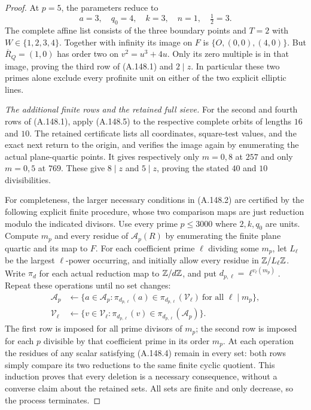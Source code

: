 \begin{proof}
At \(p=5\), the parameters reduce to
\[
                    a=3,\quad q_0=4,\quad k=3,
                           \quad n=1,\quad\tfrac12=3.
\tag{A.148.9}
\]
The complete affine list consists of the three boundary
points and \(T=2\) with \(W\in\{1,2,3,4\}\).
Together with infinity its image on \(F\) is
\(\{O,(0,0),(4,0)\}\).
But \(\overline R_Q=(1,0)\) has order two on
\(v^2=u^3+4u\).
Only its zero multiple is in that image, proving the third
row of (A.148.1) and \(2\mid z\).
In particular these two primes alone exclude every profinite
unit on either of the two explicit elliptic lines.

\emph{The additional finite rows and the retained full sieve.}
For the second and fourth rows of (A.148.1), apply
(A.148.5) to the respective complete orbits of lengths
\(16\) and \(10\).  The retained certificate lists all
coordinates, square-test values, and the exact next return
to the origin, and verifies the image again by enumerating
the actual plane-quartic points.
It gives respectively only \(m=0,8\) at \(257\) and
only \(m=0,5\) at \(769\).
These give \(8\mid z\) and \(5\mid z\), proving the
stated \(40\) and \(10\) divisibilities.

For completeness, the larger necessary conditions in
(A.148.2) are certified by the following explicit finite
procedure, whose two comparison maps are just reduction
modulo the indicated divisors.
Use every prime \(p\le3000\) where \(2,k,q_0\) are units.
Compute \(m_p\) and every residue of \(\mathcal A_p(R)\)
by enumerating the finite plane quartic and its map to \(F\).
For each coefficient prime \(\ell\) dividing some \(m_p\),
let \(L_\ell\) be the largest \(\ell\)-power occurring,
and initially allow every residue in \(\mathbb Z/L_\ell\mathbb Z\).
Write \(\pi_d\) for each actual reduction map to \(\mathbb Z/d\mathbb Z\),
and put \(d_{p,\ell}=\ell^{v_\ell(m_p)}\).
Repeat these operations until no set changes:
\[
 \begin{aligned}
 \mathcal A_p&\longleftarrow
  \{a\in\mathcal A_p:
     \pi_{d_{p,\ell}}(a)\in\pi_{d_{p,\ell}}(\mathcal V_\ell)
                            \ \text{for all }\ell\mid m_p\},\\
 \mathcal V_\ell&\longleftarrow
  \{v\in\mathcal V_\ell:
     \pi_{d_{p,\ell}}(v)\in\pi_{d_{p,\ell}}(\mathcal A_p)\}.
 \end{aligned}
\tag{A.148.10}
\]
The first row is imposed for all prime divisors of \(m_p\);
the second row is imposed for each \(p\) divisible by that
coefficient prime in its order \(m_p\).
At each operation the residues of any scalar satisfying
(A.148.4) remain in every set: both rows simply compare its
two reductions to the same finite cyclic quotient.
This induction proves that every deletion is a necessary
consequence, without a converse claim about the retained sets.
All sets are finite and only decrease, so the process terminates.


\end{proof}
